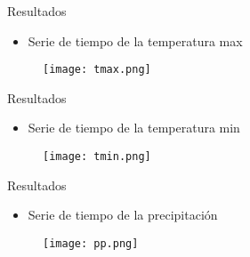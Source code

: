 \documentclass[handout,t]{beamer}
\begin{document}
\begin{frame}{Resultados}
\begin{itemize}
    \item \small{Serie de tiempo de la temperatura max}
    \end{itemize}
\begin{figure}
  \centering
  \texttt{[image: tmax.png]}
\end{figure}
\end{frame}

\begin{frame}{Resultados}
\begin{itemize}
    \item \small{Serie de tiempo de la temperatura min}
    \end{itemize}
\begin{figure}
  \centering
  \texttt{[image: tmin.png]}
\end{figure}
\end{frame}


\begin{frame}{Resultados}
\begin{itemize}
    \item \small{Serie de tiempo de la precipitación}
    \end{itemize}
\begin{figure}
  \centering
  \texttt{[image: pp.png]}
\end{figure}
\end{frame}


\end{document}
